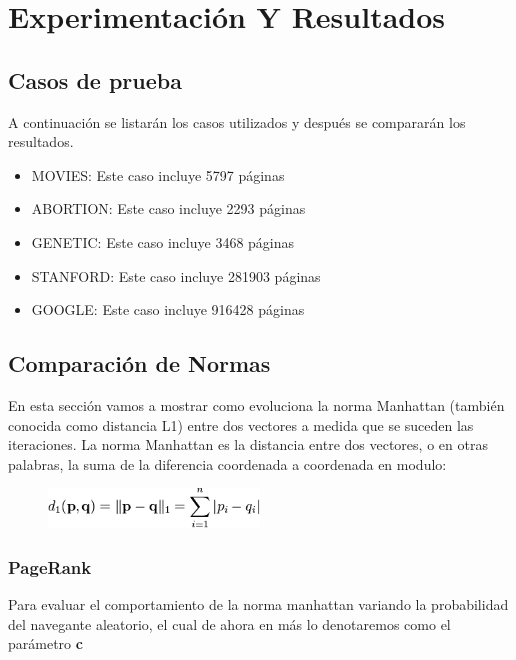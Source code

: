 \section{Experimentación Y Resultados}

\subsection{Casos de prueba}
   A continuación se listarán los casos utilizados y después se compararán los resultados.

	\begin{itemize}
		\item MOVIES: Este caso incluye 5797 páginas
		\item ABORTION: Este caso incluye 2293 páginas
		\item GENETIC: Este caso incluye 3468 páginas
		\item STANFORD: Este caso incluye 281903 páginas
		\item GOOGLE: Este caso incluye 916428 páginas
	\end{itemize}   

\subsection{Comparación de Normas}

En esta sección vamos a mostrar como evoluciona la norma Manhattan (también conocida como distancia L1) entre dos vectores a medida que se suceden las iteraciones.
La norma Manhattan es la distancia entre dos vectores, o en otras palabras, la suma de la diferencia coordenada a coordenada en modulo:

\begin{figure}[h!]
   \centering
    \includegraphics[width=0.5\textwidth]{imagenes/norma_manhattan.png}
\end{figure}


\subsubsection {PageRank}

Para evaluar el comportamiento de la norma manhattan variando la probabilidad del navegante aleatorio, el cual de ahora en más lo denotaremos como el parámetro \textbf{c}


